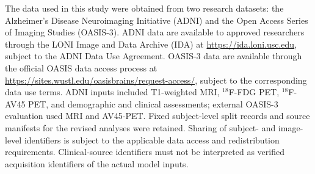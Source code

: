The data used in this study were obtained from two research datasets: the Alzheimer's Disease Neuroimaging Initiative (ADNI) and the Open Access Series of Imaging Studies (OASIS-3). ADNI data are available to approved researchers through the LONI Image and Data Archive (IDA) at \url{https://ida.loni.usc.edu}, subject to the ADNI Data Use Agreement. OASIS-3 data are available through the official OASIS data access process at \url{https://sites.wustl.edu/oasisbrains/request-access/}, subject to the corresponding data use terms. ADNI inputs included T1-weighted MRI, $^{18}$F-FDG PET, $^{18}$F-AV45 PET, and demographic and clinical assessments; external OASIS-3 evaluation used MRI and AV45-PET. Fixed subject-level split records and source manifests for the revised analyses were retained. Sharing of subject- and image-level identifiers is subject to the applicable data access and redistribution requirements. Clinical-source identifiers must not be interpreted as verified acquisition identifiers of the actual model inputs.
